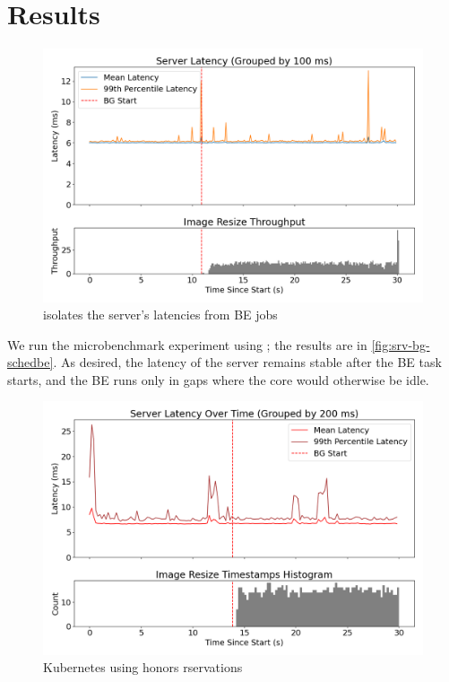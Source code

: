 \section{Results}

\begin{figure}[t]
    \centering
    \includegraphics[width=\columnwidth]{graphs/srv-bg-schedbe-low.png}
    \caption{ \beclass{} isolates the server's latencies from BE
     jobs}\label{fig:srv-bg-schedbe}
\end{figure}

We run the microbenchmark experiment using \beclass{}; the results are in
\autoref{fig:srv-bg-schedbe}. As desired, the latency of the server remains
stable after the BE task starts, and the BE runs only in gaps where the core
would otherwise be idle.

\begin{figure}[t]
    \centering
    \includegraphics[width=\columnwidth]{graphs/kubernetes-schedbe.png}
    \caption{ Kubernetes using \beclass{} honors rservations  }\label{fig:kubernetes-schedbe}
\end{figure}


